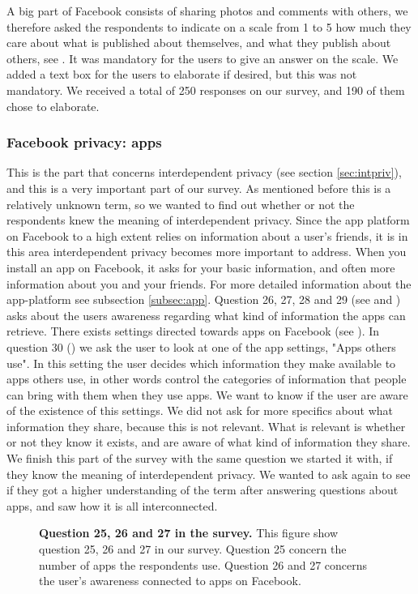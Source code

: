 A big part of Facebook consists of sharing photos and comments with others, we therefore asked the respondents to indicate on a scale from 1 to 5 how much they care about what is published about themselves, and what they publish about others, see . It was mandatory for the users to give an answer on the scale. We added a text box for the users to elaborate if desired, but this was not mandatory. We received a total of 250 responses on our survey, and 190 of them chose to elaborate. 

\subsubsection{Facebook privacy: apps}
This is the part that concerns interdependent privacy (see section \ref{sec:intpriv}), and this is a very important part of our survey. As mentioned before this is a relatively unknown term, so we wanted to find out whether or not the respondents knew the meaning of interdependent privacy. Since the app platform on Facebook to a high extent relies on information about a user's friends, it is in this area interdependent privacy becomes more important to address. When you install an app on Facebook, it asks for your basic information, and often more information about you and your friends. For more detailed information about the app-platform see subsection \ref{subsec:app}. Question 26, 27, 28 and 29 (see  and ) asks about the users awareness regarding what kind of information the apps can retrieve. There exists settings directed towards apps on Facebook (see ). In question 30 () we ask the user to look at one of the app settings, "Apps others use". In this setting the user decides which information they make available to apps others use, in other words control the categories of information that people can bring with them when they use apps. We want to know if the user are aware of the existence of this settings. We did not ask for more specifics about what information they share, because this is not relevant. What is relevant is whether or not they know it exists, and are aware of what kind of information they share. We finish this part of the survey with the same question we started it with, if they know the meaning of interdependent privacy. We wanted to ask again to see if they got a higher understanding of the term after answering questions about apps, and saw how it is all interconnected. 

\begin{figure}[h!]
\centering
{}
\caption[Question 25, 26 and 27 in the survey]{\textbf{Question 25, 26 and 27 in the survey.} This figure show question 25, 26 and 27 in our survey. Question 25 concern the number of apps the respondents use. Question 26 and 27 concerns the user's awareness connected to apps on Facebook.} 
\label{fig:page14}
\end{figure}


